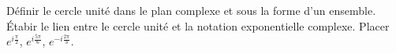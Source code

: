 %
%
	\begin{tasks}
		\task Définir le cercle unité dans le plan complexe et sous la forme d'un ensemble.
		\task Étabir le lien entre le cercle unité et la notation exponentielle complexe.
		\task Placer $e^{i\frac{\pi}{2}}$, $e^{i\frac{5\pi}{6}}$, $e^{-i\frac{2\pi}{3}}$.
	\end{tasks}
